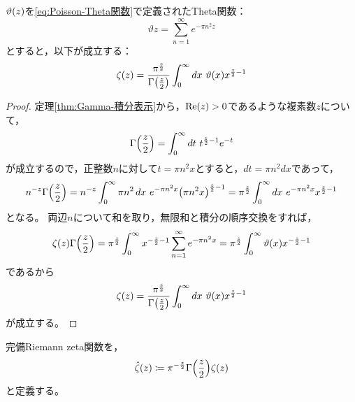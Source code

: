 \documentclass[a4paper,draft]{ltjsarticle}
\begin{document}
\begin{thm}\label{thm:RiemannZeta-第二積分}
    $\fun{\vartheta}{z}$を\eqref{eq:Poisson-Theta関数}で定義されたTheta関数：
    \begin{equation}
        \vartheta{z}=\sum_{n=1}^\infty e^{-\pi n^2 z}
    \end{equation}
    とすると，以下が成立する：
    \begin{equation}
        \fun{\zeta}{z}=\frac{\pi^{\frac{z}{2}}}{\fun{\Gamma}{\frac{z}{2}}}\int_0^\infty dx\ \fun{\vartheta}{x}x^{\frac{z}{2}-1}
    \end{equation}

    \begin{proof}
        定理\ref{thm:Gamma-積分表示}から，$\re{z}>0$であるような複素数$z$について，
        \begin{equation}
            \fun{\Gamma}{\frac{z}{2}}=\int_0^\infty dt\ t^{\frac{z}{2}-1}e^{-t}
        \end{equation}
        が成立するので，正整数$n$に対して$t=\pi n^2 x$とすると，$dt=\pi n^2dx$であって，
        \begin{equation}
            n^{-z}\fun{\Gamma}{\frac{z}{2}}=n^{-z}\int_0^\infty \pi n^2\, dx\ e^{-\pi n^2 x}\pare{\pi n^2 x}^{\frac{z}{2}-1}=\pi^{\frac{z}{2}}\int_0^\infty dx\ e^{-\pi n^2 x}x^{\frac{z}{2}-1}
        \end{equation}
        となる。
        両辺$n$について和を取り，無限和と積分の順序交換をすれば，
        \begin{equation}
            \fun{\zeta}{z}\fun{\Gamma}{\frac{z}{2}}=\pi^{\frac{z}{2}}\int_0^\infty x^{-\frac{z}{2}-1}\sum_{n=1}^\infty e^{-\pi n^2 x}=\pi^{\frac{z}{2}}\int_0^\infty \fun{\vartheta}{x}x^{-\frac{z}{2}-1}
        \end{equation}
        であるから
        \begin{equation}
            \fun{\zeta}{z}=\frac{\pi^{\frac{z}{2}}}{\fun{\Gamma}{\frac{z}{2}}}\int_0^\infty dx\ \fun{\vartheta}{x}x^{\frac{z}{2}-1}
        \end{equation}
        が成立する。
    \end{proof}
\end{thm}


\begin{defi}
    完備Riemann zeta関数を，
    \begin{equation}
        \fun{\hat{\zeta}}{z}\coloneqq \pi^{-\frac{z}{2}}\fun{\Gamma}{\frac{z}{2}}\fun{\zeta}{z}
        \label{eq:RiemannZeta-完備RiemannZetaの定義}
    \end{equation}
    と定義する。
\end{defi}
\end{document}
